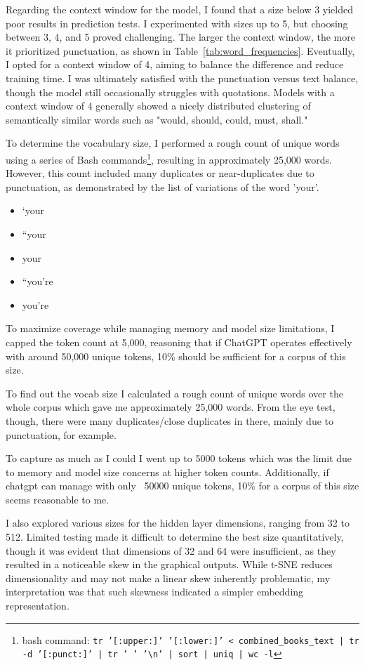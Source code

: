 \documentclass[12pt]{article} \usepackage{COSC420style} \usepackage{soul}
\begin{document}
Regarding the context window for the model, I found that a size below 3 yielded poor results in
prediction tests. I experimented with sizes up to 5, but choosing between 3, 4, and 5 proved
challenging. The larger the context window, the more it prioritized punctuation, as shown in
Table~\ref{tab:word_frequencies}. Eventually, I opted for a context window of 4, aiming to balance
the difference and reduce training time. I was ultimately satisfied with the punctuation versus text
balance, though the model still occasionally struggles with quotations. Models with a context window
of 4 generally showed a nicely distributed clustering of semantically similar words such as "would,
should, could, must, shall."

To determine the vocabulary size, I performed a rough count of unique words using a series of Bash
commands\footnote{bash command: \texttt{tr '[:upper:]' '[:lower:]' < combined\_books\_text | tr -d
'[:punct:]' | tr ' ' '\textbackslash{}n' | sort | uniq | wc -l}}, resulting in approximately 25,000
words. However, this count included many duplicates or near-duplicates due to punctuation, as
demonstrated by the list of variations of the word 'your'.

\begin{itemize}
	\item   ‘your
	\item   “your
	\item   your
	\item   “you’re
	\item   you’re
\end{itemize}

To maximize coverage while managing
memory and model size limitations, I capped the token count at 5,000, reasoning that if ChatGPT
operates effectively with around 50,000 unique tokens, 10\% should be sufficient for a corpus of this
size.

To find out the vocab size I calculated a rough count of unique words over the whole corpus which gave me approximately 25,000
words. From the eye test, though, there were many duplicates/close duplicates in there, mainly due
to punctuation, for example.


To capture as much as I could I went up to 5000 tokens which was the limit due to memory and model
size concerns at higher token counts. Additionally, if chatgpt can manage with only ~50000 unique
tokens, 10\% for a corpus of this size seems reasonable to me.

I also explored various sizes for the hidden layer dimensions, ranging from 32 to 512. Limited
testing made it difficult to determine the best size quantitatively, though it was evident that
dimensions of 32 and 64 were insufficient, as they resulted in a noticeable skew in the graphical
outputs. While t-SNE reduces dimensionality and may not make a linear skew inherently problematic,
my interpretation was that such skewness indicated a simpler embedding representation.
\end{document}
